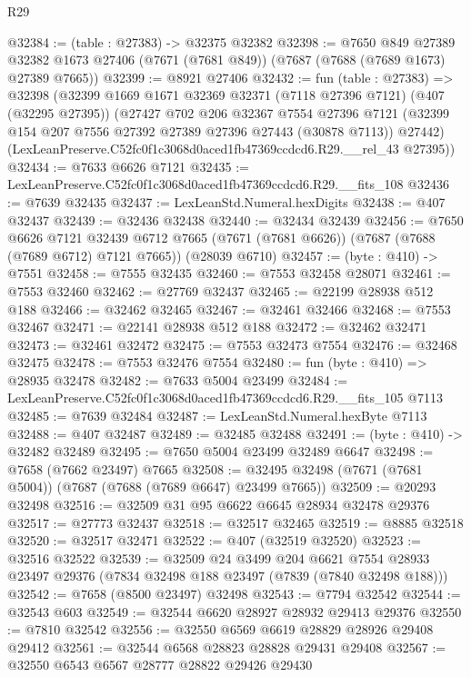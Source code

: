\begin{lexlean}{R29}
\begin{coremodule}
@32384 := (table : @27383) -> @32375 @32382
@32398 := @7650
    @849
    @27389
    @32382
    @1673
    @27406
    (@7671 (@7681 @849))
    (@7687 (@7688 (@7689 @1673) @27389 @7665))
@32399 := @8921 @27406
@32432 := fun (table : @27383) =>
  @32398
    (@32399
      @1669
      @1671
      @32369
      @32371
      (@7118 @27396 @7121)
      (@407 (@32295 @27395))
      (@27427
        @702
        @206
        @32367
        @7554
        @27396
        @7121
        (@32399 @154 @207 @7556 @27392 @27389 @27396 @27443 (@30878 @7113))
        @27442)
      (LexLeanPreserve.C52fc0f1c3068d0aced1fb47369ccdcd6.R29.__rel_43 @27395))
@32434 := @7633 @6626 @7121
@32435 := LexLeanPreserve.C52fc0f1c3068d0aced1fb47369ccdcd6.R29.__fits_108
@32436 := @7639 @32435
@32437 := LexLeanStd.Numeral.hexDigits
@32438 := @407 @32437
@32439 := @32436 @32438
@32440 := @32434 @32439
@32456 := @7650
    @6626
    @7121
    @32439
    @6712
    @7665
    (@7671 (@7681 @6626))
    (@7687 (@7688 (@7689 @6712) @7121 @7665))
    (@28039 @6710)
@32457 := (byte : @410) -> @7551
@32458 := @7555 @32435
@32460 := @7553 @32458 @28071
@32461 := @7553 @32460
@32462 := @27769 @32437
@32465 := @22199 @28938 @512 @188
@32466 := @32462 @32465
@32467 := @32461 @32466
@32468 := @7553 @32467
@32471 := @22141 @28938 @512 @188
@32472 := @32462 @32471
@32473 := @32461 @32472
@32475 := @7553 @32473 @7554
@32476 := @32468 @32475
@32478 := @7553 @32476 @7554
@32480 := fun (byte : @410) => @28935 @32478
@32482 := @7633 @5004 @23499
@32484 := LexLeanPreserve.C52fc0f1c3068d0aced1fb47369ccdcd6.R29.__fits_105 @7113
@32485 := @7639 @32484
@32487 := LexLeanStd.Numeral.hexByte @7113
@32488 := @407 @32487
@32489 := @32485 @32488
@32491 := (byte : @410) -> @32482 @32489
@32495 := @7650 @5004 @23499 @32489 @6647
@32498 := @7658 (@7662 @23497) @7665
@32508 := @32495 @32498 (@7671 (@7681 @5004)) (@7687 (@7688 (@7689 @6647) @23499 @7665))
@32509 := @20293 @32498
@32516 := @32509 @31 @95 @6622 @6645 @28934 @32478 @29376
@32517 := @27773 @32437
@32518 := @32517 @32465
@32519 := @8885 @32518
@32520 := @32517 @32471
@32522 := @407 (@32519 @32520)
@32523 := @32516 @32522
@32539 := @32509
    @24
    @3499
    @204
    @6621
    @7554
    @28933
    @23497
    @29376
    (@7834 @32498 @188 @23497 (@7839 (@7840 @32498 @188)))
@32542 := @7658 (@8500 @23497) @32498
@32543 := @7794 @32542
@32544 := @32543 @603
@32549 := @32544 @6620 @28927 @28932 @29413 @29376
@32550 := @7810 @32542
@32556 := @32550 @6569 @6619 @28829 @28926 @29408 @29412
@32561 := @32544 @6568 @28823 @28828 @29431 @29408
@32567 := @32550 @6543 @6567 @28777 @28822 @29426 @29430

\end{coremodule}
\end{lexlean}
